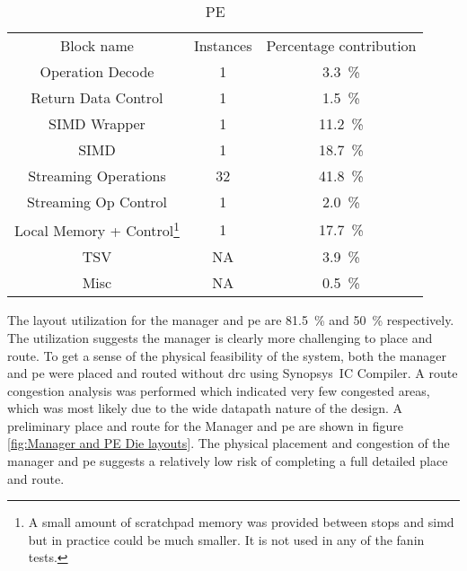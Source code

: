 \begin{table}[h]
\begin{subtable}{1\textwidth}
    \centering
    \begin{adjustbox}{width=0.55\textwidth}
      \begin{tabular}{|c|c|c|}
        \hline
       \multirow{2}{*}{Block name}    &  \multirow{2}{*}{Instances}        &  \multirow{2}{*}{Percentage contribution}     \\  %
                                      &                                    &                                               \\
        \hline  %
     Operation Decode    & 1&\SI[per-mode=symbol]{ 3.3}{\percent}  \\
   Return Data Control   & 1&\SI[per-mode=symbol]{ 1.5}{\percent}  \\
    SIMD Wrapper         & 1&\SI[per-mode=symbol]{11.2}{\percent}  \\
        SIMD             & 1&\SI[per-mode=symbol]{18.7}{\percent}  \\
  Streaming Operations   &32&\SI[per-mode=symbol]{41.8}{\percent}  \\
  Streaming Op Control   & 1&\SI[per-mode=symbol]{ 2.0}{\percent}  \\
 Local Memory + Control\footnote{A small amount of scratchpad memory was provided between \acp{stop} and \ac{simd} but in practice could be much smaller. It is not used in any of the fanin tests.}  & 1&\SI[per-mode=symbol]{17.7}{\percent}  \\ 
        TSV              &NA&\SI[per-mode=symbol]{ 3.9}{\percent}  \\
        Misc             &NA&\SI[per-mode=symbol]{ 0.5}{\percent}  \\
        \hline
      \end{tabular}
    \end{adjustbox}
    \vspace{3pt}
    \captionsetup{justification=centering, skip=10pt}
    \caption{PE}
    \label{tab:PE Area Contribution}
  \end{subtable}
  \end{table}

The layout utilization for the manager and \ac{pe} are \SI{81.5}{\percent} and \SI{50}{\percent} respectively.
The utilization suggests the manager is clearly more challenging to place and route.
To get a sense of the physical feasibility of the system, both the manager and \ac{pe} were placed and routed without \ac{drc} using Synopsys\textregistered ~IC Compiler\texttrademark.
A route congestion analysis was performed which indicated very few congested areas, which was most likely due to the wide datapath nature of the design.
A preliminary place and route for the Manager and \ac{pe} are shown in figure \ref{fig:Manager and PE Die layouts}. 
The physical placement and congestion of the manager and \ac{pe} suggests a relatively low risk of completing a full detailed place and route.

